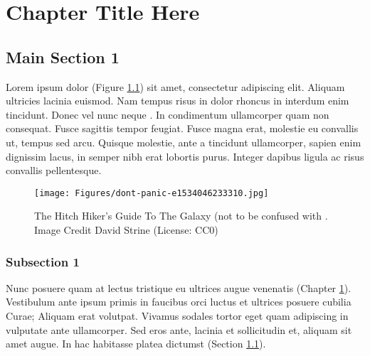 
\chapter{Chapter Title Here}\label{chapter:firstchapter} %

\label{ChapterX} %


\section{Main Section 1}\label{sec:firstsection}

Lorem ipsum dolor (Figure \ref{fig:ThisFig}) sit amet, consectetur adipiscing elit\cite{fleischman1994pragmatics}.
Aliquam ultricies lacinia euismod.
Nam tempus risus in dolor rhoncus in interdum enim tincidunt.
Donec vel nunc neque \cite{lawless1995multidimensional}.
In condimentum ullamcorper quam non consequat.
Fusce sagittis tempor feugiat.
Fusce magna erat, molestie eu convallis ut, tempus sed arcu.
Quisque molestie, ante a tincidunt ullamcorper, sapien enim dignissim lacus, in semper nibh erat lobortis purus.
Integer dapibus ligula ac risus convallis pellentesque.

\begin{figure}
\begin{centering}
\texttt{[image: Figures/dont-panic-e1534046233310.jpg]}
\caption{The Hitch Hiker's Guide To The Galaxy (not to be confused with \cite{Reference1}. Image Credit David Strine (License: CC0)}
\label{fig:ThisFig}
\end{centering}
\end{figure}

\subsection{Subsection 1}

Nunc posuere quam at lectus tristique eu ultrices augue venenatis (Chapter \ref{chapter:firstchapter}).
Vestibulum ante ipsum primis in faucibus orci luctus et ultrices posuere cubilia Curae; Aliquam erat volutpat.
Vivamus sodales tortor eget quam adipiscing in vulputate ante ullamcorper.
Sed eros ante, lacinia et sollicitudin et, aliquam sit amet augue.
In hac habitasse platea dictumst (Section \ref{sec:firstsection}).

